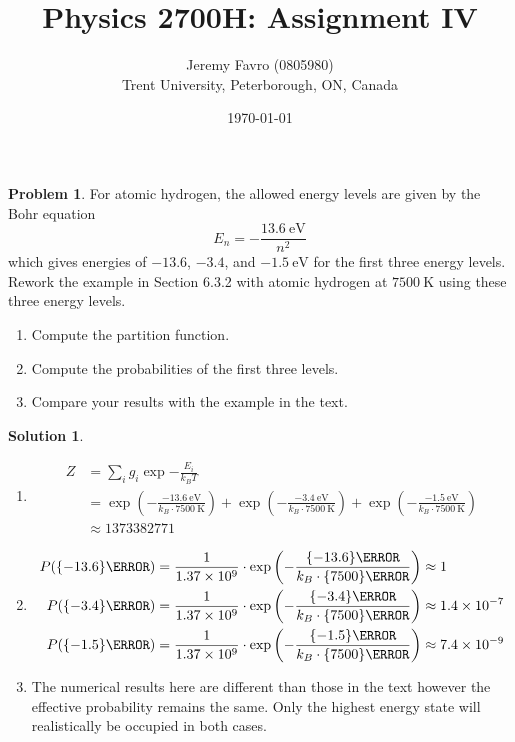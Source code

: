 \documentclass[10pt]{article}
\title{Physics 2700H: Assignment IV}
\author{Jeremy Favro (0805980) \\ Trent University, Peterborough, ON, Canada}
\date{\today}
\theoremstyle{definition}
\newtheorem{problem}{Problem}
\newtheorem{soln}{Solution}
\begin{document}
\maketitle
\begin{problem}
For atomic hydrogen, the allowed energy levels are given by the Bohr equation
$$E_n=-\frac{\qty{13.6}{\electronvolt}}{n^2}$$
which gives energies of $-13.6$, $-3.4$, and $\qty{-1.5}{\electronvolt}$ for the first three energy levels.
Rework the example in Section 6.3.2 with atomic hydrogen at $\qty{7500}{\kelvin}$ using these three energy levels.
\begin{enumerate}[label=(\alph*)]
  \item Compute the partition function.
  \item Compute the probabilities of the first three levels.
  \item Compare your results with the example in the text.
\end{enumerate}
\end{problem}
\begin{soln}~
  \begin{enumerate}[label=(\alph*)]
    \item \begin{align*}
            Z & =\sum_{i}g_i\exp{-\frac{E_i}{k_BT}}                                                     \\
              & =\exp\left(-\frac{\qty{-13.6}{\electronvolt}}{k_B\cdot\qty{7500}{\kelvin}}\right)+
            \exp\left(-\frac{\qty{-3.4}{\electronvolt}}{k_B\cdot\qty{7500}{\kelvin}}\right)+
            \exp\left(-\frac{\qty{-1.5}{\electronvolt}}{k_B\cdot\qty{7500}{\kelvin}}\right)             \\
              & \approx \num[round-mode=figures,round-precision=3,scientific-notation=true]{1373382771}
          \end{align*}
    \item \begin{align*}
            P(\qty{-13.6}{\electronvolt}) & =
            \frac{1}{\num[round-mode=figures,round-precision=3,scientific-notation=true]{1373382771}}\cdot\exp
            \left(-\frac{\qty{-13.6}{\electronvolt}}{k_B\cdot\qty{7500}{\kelvin}}\right)\approx 1           \\
            P(\qty{-3.4}{\electronvolt})  & =
            \frac{1}{\num[round-mode=figures,round-precision=3,scientific-notation=true]{1373382771}}\cdot\exp
            \left(-\frac{\qty{-3.4}{\electronvolt}}{k_B\cdot\qty{7500}{\kelvin}}\right)\approx \num{1.4d-7} \\
            P(\qty{-1.5}{\electronvolt})  & =
            \frac{1}{\num[round-mode=figures,round-precision=3,scientific-notation=true]{1373382771}}\cdot\exp
            \left(-\frac{\qty{-1.5}{\electronvolt}}{k_B\cdot\qty{7500}{\kelvin}}\right)\approx \num{7.4d-9}
          \end{align*}
    \item The numerical results here are different than those in the text however the effective probability remains the same. Only the highest energy state
          will realistically be occupied in both cases.
  \end{enumerate}
\end{soln}
\end{document}
